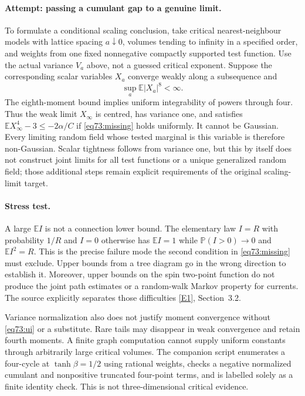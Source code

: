 \documentclass[11pt,a4paper]{article}
\numberwithin{equation}{section}
\newcommand{\eref}[2]{\hyperlink{extra:#1:#2}{[E#2]}}
\begin{document}
\paragraph{Attempt: passing a cumulant gap to a genuine limit.}
To formulate a conditional scaling conclusion, take critical nearest-neighbour
models with lattice spacing $a\downarrow0$, volumes tending to infinity
in a specified order, and weights from one fixed nonnegative compactly
supported test function. Use the actual variance $V_a$ above, not a guessed
critical exponent. Suppose the corresponding scalar variables $X_a$ converge
weakly along a subsequence and
\begin{equation}\label{eq73:ui}
 \sup_a\mathbb E|X_a|^8<\infty.
\end{equation}
The eighth-moment bound implies uniform integrability of powers through
four. Thus the weak limit $X_\infty$ is centred, has variance one, and
satisfies
$\mathbb E X_\infty^4-3\leq-2\alpha/C$ if
\eqref{eq73:missing} holds uniformly. It cannot be Gaussian.
Every limiting random field whose tested marginal is this variable is
therefore non-Gaussian. Scalar tightness follows from variance one, but
this by itself does not construct joint limits for all test functions or
a unique generalized random field; those additional steps remain explicit
requirements of the original scaling-limit target.

\paragraph{Stress test.}
A large $\mathbb E I$ is not a connection lower bound. The elementary law
$I=R$ with probability $1/R$ and $I=0$ otherwise has $\mathbb E I=1$
while $\mathbb P(I>0)\to0$ and $\mathbb E I^2=R$.
This is the precise failure mode the second condition in
\eqref{eq73:missing} must exclude. Upper bounds from a tree diagram go in
the wrong direction to establish it. Moreover, upper bounds on the
spin two-point function do not produce the joint path estimates or a
random-walk Markov property for currents. The source explicitly separates
those difficulties \eref{statement}{1}, Section~3.2.

Variance normalization also does not justify moment convergence without
\eqref{eq73:ui} or a substitute. Rare tails may disappear in weak
convergence and retain fourth moments. A finite graph computation cannot
supply uniform constants through arbitrarily large critical volumes.
The companion script enumerates a four-cycle at $\tanh\beta=1/2$ using
rational weights, checks a negative normalized cumulant and nonpositive
truncated four-point terms, and is labelled solely as a finite identity
check. This is not three-dimensional critical evidence.
\end{document}
